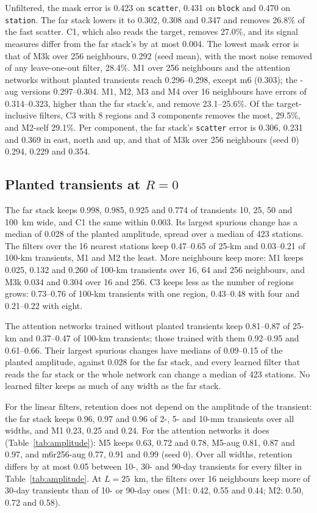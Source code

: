 \documentclass[preprint,12pt,authoryear]{elsarticle}
\begin{document}
Unfiltered, the mask error is 0.423 on \texttt{scatter}, 0.431 on \texttt{block} and 0.470 on \texttt{station}. The far stack lowers it to 0.302, 0.308 and 0.347 and removes 26.8\% of the fast scatter. C1, which also reads the target, removes 27.0\%, and its signal measures differ from the far stack's by at most 0.004. The lowest mask error is that of M3k over 256 neighbours, 0.292 (seed mean), with the most noise removed of any leave-one-out filter, 28.4\%. M1 over 256 neighbours and the attention networks without planted transients reach 0.296--0.298, except m6 (0.303); the -aug versions 0.297--0.304. M1, M2, M3 and M4 over 16 neighbours have errors of 0.314--0.323, higher than the far stack's, and remove 23.1--25.6\%. Of the target-inclusive filters, C3 with 8 regions and 3 components removes the most, 29.5\%, and M2-self 29.1\%. Per component, the far stack's \texttt{scatter} error is 0.306, 0.231 and 0.369 in east, north and up, and that of M3k over 256 neighbours (seed 0) 0.294, 0.229 and 0.354.

\subsection{Planted transients at $R = 0$}
\label{sec:res-planted}

The far stack keeps 0.998, 0.985, 0.925 and 0.774 of transients 10, 25, 50 and 100~km wide, and C1 the same within 0.003. Its largest spurious change has a median of 0.028 of the planted amplitude, spread over a median of 423 stations. The filters over the 16 nearest stations keep 0.47--0.65 of 25-km and 0.03--0.21 of 100-km transients, M1 and M2 the least. More neighbours keep more: M1 keeps 0.025, 0.132 and 0.260 of 100-km transients over 16, 64 and 256 neighbours, and M3k 0.034 and 0.304 over 16 and 256. C3 keeps less as the number of regions grows: 0.73--0.76 of 100-km transients with one region, 0.43--0.48 with four and 0.21--0.22 with eight.

The attention networks trained without planted transients keep 0.81--0.87 of 25-km and 0.37--0.47 of 100-km transients; those trained with them 0.92--0.95 and 0.61--0.66. Their largest spurious changes have medians of 0.09--0.15 of the planted amplitude, against 0.028 for the far stack, and every learned filter that reads the far stack or the whole network can change a median of 423 stations. No learned filter keeps as much of any width as the far stack.

For the linear filters, retention does not depend on the amplitude of the transient: the far stack keeps 0.96, 0.97 and 0.96 of 2-, 5- and 10-mm transients over all widths, and M1 0.23, 0.25 and 0.24. For the attention networks it does (Table~\ref{tab:amplitude}): M5 keeps 0.63, 0.72 and 0.78, M5-aug 0.81, 0.87 and 0.97, and m6r256-aug 0.77, 0.91 and 0.99 (seed 0). Over all widths, retention differs by at most 0.05 between 10-, 30- and 90-day transients for every filter in Table~\ref{tab:amplitude}. At $L = 25$~km, the filters over 16 neighbours keep more of 30-day transients than of 10- or 90-day ones (M1: 0.42, 0.55 and 0.44; M2: 0.50, 0.72 and 0.58).
\end{document}
